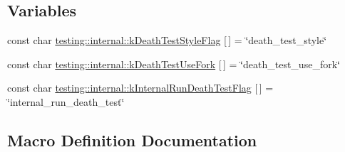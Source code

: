 \subsection*{Variables}
\begin{DoxyCompactItemize}
\item 
const char \hyperlink{namespacetesting_1_1internal_a008ebfe0c0347d65e5e06e4d310981b3}{testing\+::internal\+::k\+Death\+Test\+Style\+Flag} \mbox{[}$\,$\mbox{]} = \char`\"{}death\+\_\+test\+\_\+style\char`\"{}
\item 
const char \hyperlink{namespacetesting_1_1internal_a32051e2574562b548be3e26a52eaa553}{testing\+::internal\+::k\+Death\+Test\+Use\+Fork} \mbox{[}$\,$\mbox{]} = \char`\"{}death\+\_\+test\+\_\+use\+\_\+fork\char`\"{}
\item 
const char \hyperlink{namespacetesting_1_1internal_a8572303d929880adf30db00952e1c45d}{testing\+::internal\+::k\+Internal\+Run\+Death\+Test\+Flag} \mbox{[}$\,$\mbox{]} = \char`\"{}internal\+\_\+run\+\_\+death\+\_\+test\char`\"{}
\end{DoxyCompactItemize}


\subsection{Macro Definition Documentation}
\hypertarget{gtest-death-test-internal_8h_a29a145cda8bd2d0c6a78b0ac1d670d18}{}
